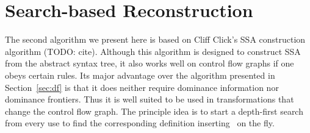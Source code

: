 \section{Search-based Reconstruction}

The second algorithm we present here is based on Cliff Click's SSA construction algorithm (TODO: cite).
Although this algorithm is designed to construct SSA from the abstract syntax tree, it also works well on control flow graphs if one obeys certain rules.
Its major advantage over the algorithm presented in Section~\ref{sec:df} is that it does neither require dominance information nor dominance frontiers.
Thus it is well suited to be used in transformations that change the control flow graph.
The principle idea is to start a depth-first search from every use to find the corresponding definition inserting \phiops\ on the fly. 



